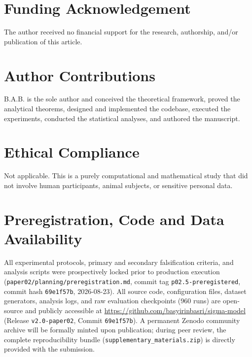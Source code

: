 \documentclass{article}
\theoremstyle{plain}
\theoremstyle{definition}
\begin{document}
\section*{Funding Acknowledgement}
The author received no financial support for the research, authorship, and/or publication of this article.

\section*{Author Contributions}
B.A.B. is the sole author and conceived the theoretical framework, proved the analytical theorems, designed and implemented the codebase, executed the experiments, conducted the statistical analyses, and authored the manuscript.

\section*{Ethical Compliance}
Not applicable. This is a purely computational and mathematical study that did not involve human participants, animal subjects, or sensitive personal data.

\section*{Preregistration, Code and Data Availability}
All experimental protocols, primary and secondary falsification criteria, and analysis scripts were prospectively locked prior to production execution (\texttt{paper02/planning/preregistration.md}, commit tag \texttt{p02.5-preregistered}, commit hash \texttt{69e1f57b}, 2026-08-23). All source code, configuration files, dataset generators, analysis logs, and raw evaluation checkpoints (960 runs) are open-source and publicly accessible at \url{https://github.com/basyirinbasri/sigma-model} (Release \texttt{v2.0-paper02}, Commit \texttt{69e1f57b}). A permanent Zenodo community archive will be formally minted upon publication; during peer review, the complete reproducibility bundle (\texttt{supplementary\_materials.zip}) is directly provided with the submission.


\end{document}
